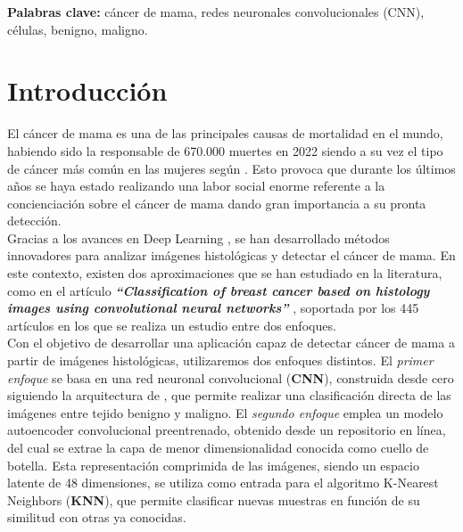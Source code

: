 \documentclass[12pt]{article} %
\begin{document}
\vspace{.5cm}

\textbf{Palabras clave:} cáncer de mama, redes neuronales convolucionales (CNN), células, benigno, maligno.

\newpage
\tableofcontents

\newpage

\section{Introducción}
El cáncer de mama es una de las principales causas de mortalidad en el mundo, habiendo sido la responsable de 670.000 muertes en 2022 siendo a su vez el tipo de cáncer más común en las mujeres según \cite{who_breast_cancer}. Esto provoca que durante los últimos años se haya estado realizando una labor social enorme referente a la concienciación sobre el cáncer de mama dando gran importancia a su pronta detección.\\

Gracias a los avances en Deep Learning \cite{shinde2018review}, se han desarrollado métodos innovadores para analizar imágenes histológicas y detectar el cáncer de mama. En este contexto, existen dos aproximaciones que se han estudiado en la literatura, como en el artículo \textit{\textbf{“Classification of breast cancer based on histology images using convolutional neural networks”}} \cite{bardou2018classification}, soportada por los 445 artículos en los que se realiza un estudio entre dos enfoques.\\

Con el objetivo de desarrollar una aplicación capaz de detectar cáncer de mama a partir de imágenes histológicas, utilizaremos dos enfoques distintos. El \textit{primer enfoque} se basa en una red neuronal convolucional (\textbf{CNN}), construida desde cero siguiendo la arquitectura de \cite{bardou2018classification}, que permite realizar una clasificación directa de las imágenes entre tejido benigno y maligno. El \textit{segundo enfoque} emplea un modelo autoencoder convolucional preentrenado, obtenido desde un repositorio en línea, del cual se extrae la capa de menor dimensionalidad conocida como cuello de botella. Esta representación comprimida de las imágenes, siendo un espacio latente de 48 dimensiones, se utiliza como entrada para el algoritmo K-Nearest Neighbors (\textbf{KNN}), que permite clasificar nuevas muestras en función de su similitud con otras ya conocidas.\\
\end{document}
